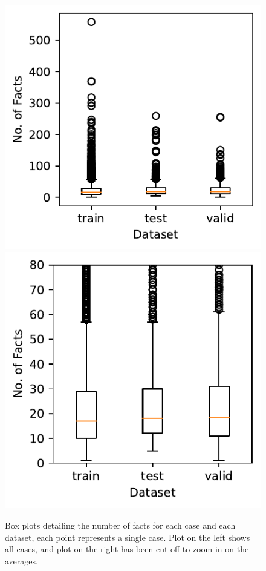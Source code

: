 \documentclass{article}
\begin{document}
\begin{figure}[H]
    \centering
    \includegraphics[scale=0.8]{facts_boxplots.pdf}
    \includegraphics[scale=0.8]{facts_boxplots_cutoff.pdf}
    \caption{Box plots detailing the number of facts for each case and
    each dataset, each point represents a single case. Plot on the
    left shows all cases, and plot on the right has been cut off to
    zoom in on the averages.}
    \label{fig: facts box plots}
\end{figure}
\end{document}
